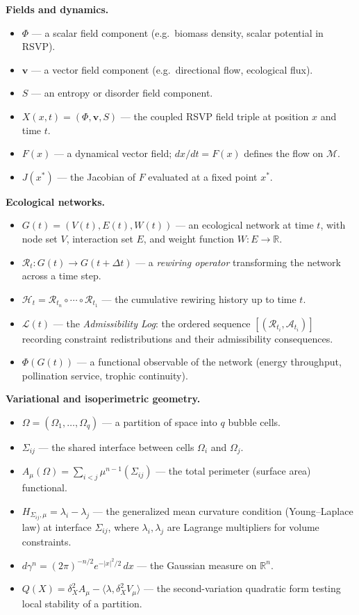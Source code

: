 \documentclass[11pt,a4paper]{article}
\newcommand{\Aspace}{\mathcal{A}}
\newcommand{\Mspace}{\mathcal{M}}
\newcommand{\vfield}{\mathbf{v}}
\begin{document}
\medskip
\noindent\textbf{Fields and dynamics.}
\begin{itemize}
  \item $\Phi$ --- a scalar field component (e.g.\ biomass density, scalar potential in RSVP).
  \item $\vfield$ --- a vector field component (e.g.\ directional flow, ecological flux).
  \item $S$ --- an entropy or disorder field component.
  \item $X(x,t)=(\Phi,\vfield,S)$ --- the coupled RSVP field triple at position $x$ and time $t$.
  \item $F(x)$ --- a dynamical vector field; $dx/dt = F(x)$ defines the flow on $\Mspace$.
  \item $J(x^\ast)$ --- the Jacobian of $F$ evaluated at a fixed point $x^\ast$.
\end{itemize}

\medskip
\noindent\textbf{Ecological networks.}
\begin{itemize}
  \item $G(t)=(V(t),E(t),W(t))$ --- an ecological network at time $t$, with node set $V$, interaction set $E$, and weight function $W:E\to\mathbb{R}$.
  \item $\mathcal{R}_t:G(t)\to G(t+\Delta t)$ --- a \emph{rewiring operator} transforming the network across a time step.
  \item $\mathcal{H}_t = \mathcal{R}_{t_n}\circ\cdots\circ\mathcal{R}_{t_1}$ --- the cumulative rewiring history up to time $t$.
  \item $\mathcal{L}(t)$ --- the \emph{Admissibility Log}: the ordered sequence $[(\mathcal{R}_{t_i},\Aspace_{t_i})]$ recording constraint redistributions and their admissibility consequences.
  \item $\Phi(G(t))$ --- a functional observable of the network (energy throughput, pollination service, trophic continuity).
\end{itemize}

\medskip
\noindent\textbf{Variational and isoperimetric geometry.}
\begin{itemize}
  \item $\Omega=(\Omega_1,\dots,\Omega_q)$ --- a partition of space into $q$ bubble cells.
  \item $\Sigma_{ij}$ --- the shared interface between cells $\Omega_i$ and $\Omega_j$.
  \item $A_\mu(\Omega)=\sum_{i<j}\mu^{n-1}(\Sigma_{ij})$ --- the total perimeter (surface area) functional.
  \item $H_{\Sigma_{ij},\mu}=\lambda_i-\lambda_j$ --- the generalized mean curvature condition (Young--Laplace law) at interface $\Sigma_{ij}$, where $\lambda_i,\lambda_j$ are Lagrange multipliers for volume constraints.
  \item $d\gamma^n=(2\pi)^{-n/2}e^{-|x|^2/2}\,dx$ --- the Gaussian measure on $\mathbb{R}^n$.
  \item $Q(X)=\delta_X^2 A_\mu - \langle\lambda,\delta_X^2 V_\mu\rangle$ --- the second-variation quadratic form testing local stability of a partition.
\end{itemize}
\end{document}
